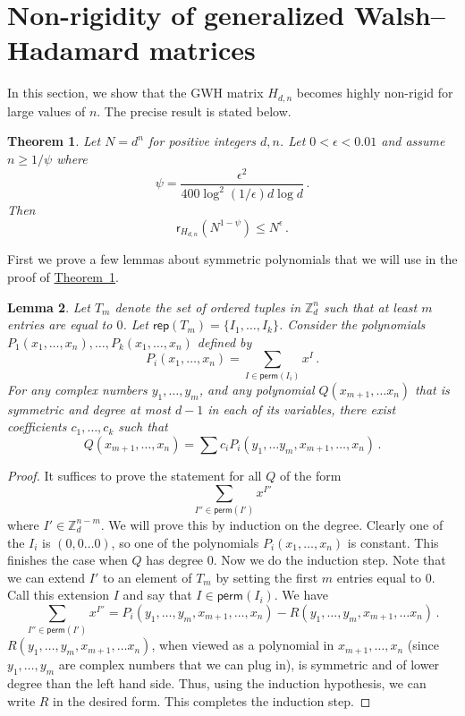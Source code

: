 \documentclass[11pt]{article}
\numberwithin{equation}{section}
\newtheorem{theorem}{Theorem}[section]
\newtheorem{lemma}[theorem]{Lemma}
\theoremstyle{definition}
\theoremstyle{plain}
\newcommand{\Z}{\mathbb Z}
\newcommand{\expref}[2]{\hyperref[#2]{#1~\ref{#2}}}
\theoremstyle{definition}
\renewcommand\Z{{\mathbb{Z}}}
\newcommand\perm{\textsf{perm}}
\newcommand\rep{\textsf{rep}}
\begin{document}
%
%
\section{Non-rigidity of generalized Walsh--Hadamard matrices}
\label{sec_Hadamard}
In this section, we show that the %
GWH  %
matrix $H_{d,n}$ becomes highly non-rigid for large values of $n$.  The precise result is stated below.
\begin{theorem} \label{Hadamard}
Let $N = d^n$ for positive integers $d,n$.   Let $0 < \epsilon < 0.01 $ and assume $n \geq 1/\psi$ where \[\psi = \frac{\epsilon^2 }{400\log^2 (1/\epsilon) d \log d} \,.\]
Then
\[
\textsf{r}_{H_{d,n}}\left(N^{1 - \psi}\right) \leq N^{ \epsilon} \,.
\]
\end{theorem}

First we prove a few lemmas about symmetric polynomials that we will use in the proof of \expref{Theorem}{Hadamard}.
\begin{lemma}\label{symmetric}
  Let $T_m$ denote the set of ordered tuples in $\Z_d^n$ such that at least $m$ entries are equal to $0$.
%
Let   %
$\rep(T_m) = \{I_1, \dots , I_k \}$.  Consider the  polynomials $P_1(x_1, \dots , x_n), \dots , P_k(x_1, \dots , x_n)$ defined by
\[
P_i(x_1, \dots , x_n) = \sum_{I \in \perm(I_i)} x^{I} \,.
\]
For any complex numbers  $y_1, \dots , y_m$, and any polynomial $Q(x_{m+1}, \dots x_n)$ that is symmetric and degree at most $d-1$ in each of its variables, there exist coefficients $c_1, \dots , c_k$ such that 
\[
Q(x_{m+1}, \dots , x_n) = \sum c_iP_i(y_1, \dots y_m, x_{m+1}, \dots , x_n) \,.
\]
\end{lemma}
\begin{proof}
It suffices to prove the statement for all $Q$ of the form 
\[
\sum_{I'' \in \perm(I')} x^{I''}
\]
where $I' \in \Z_d^{n-m}$.  We will prove this by induction on the degree.  Clearly one of the $I_i$ is $(0,0 \dots 0)$, so one of the polynomials $P_i(x_1, \dots , x_n)$ is constant.  This finishes the case when $Q$ has degree $0$.  Now we do the induction step.  Note that we can extend $I'$ to an element of $T_m$ by setting the first $m$ entries equal to $0$.  Call this extension $I$ and say that $I \in \perm(I_i)$.  We have
\[
\sum_{I'' \in \perm(I')} x^{I''} = P_i(y_1, \dots ,y_m, x_{m+1}, \dots , x_n) - R(y_1, \dots , y_m, x_{m+1}, \dots x_n) \,.
\]
$R(y_1, \dots , y_m, x_{m+1}, \dots x_n)$, when viewed as a polynomial in $x_{m+1}, \dots , x_n$ (since $y_1, \dots , y_m$ are complex numbers that we can plug in), is symmetric and of lower degree than the left hand side.  Thus, using the induction hypothesis, we can write $R$ in the desired form.  This completes the induction step.  
\end{proof}
\end{document}
